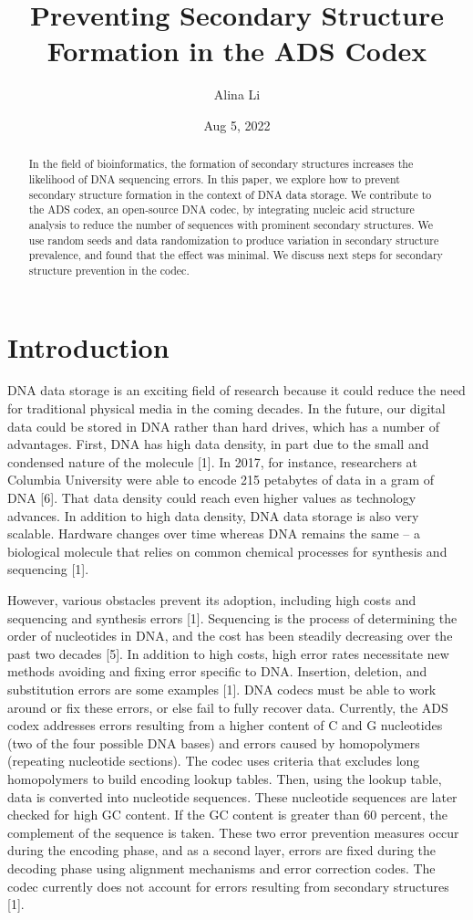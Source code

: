 \documentclass{article}
\title{Preventing Secondary Structure Formation in the ADS Codex}
\author{Alina Li}
\date{Aug 5, 2022}
\begin{document}
\maketitle

\begin{abstract}
In the field of bioinformatics, the formation of secondary structures increases the likelihood of DNA sequencing errors. In this paper, we explore how to prevent secondary structure formation in the context of DNA data storage. We contribute to the ADS codex, an open-source DNA codec, by integrating nucleic acid structure analysis to reduce the number of sequences with prominent secondary structures. We use random seeds and data randomization to produce variation in secondary structure prevalence, and found that the effect was minimal. We discuss next steps for secondary structure prevention in the codec.
\end{abstract}

\section{Introduction}
DNA data storage is an exciting field of research because it could reduce the need for traditional physical media in the coming decades. In the future, our digital data could be stored in DNA rather than hard drives, which has a number of advantages. First, DNA has high data density, in part due to the small and condensed nature of the molecule [1]. In 2017, for instance, researchers at Columbia University were able to encode 215 petabytes of data in a gram of DNA [6]. That data density could reach even higher values as technology advances. In addition to high data density, DNA data storage is also very scalable. Hardware changes over time whereas DNA remains the same -- a biological molecule that relies on common chemical processes for synthesis and sequencing [1].  

However, various obstacles prevent its adoption, including high costs and sequencing and synthesis errors [1]. Sequencing is the process of determining the order of nucleotides in DNA, and the cost has been steadily decreasing over the past two decades [5]. In addition to high costs, high error rates necessitate new methods avoiding and fixing error specific to DNA. Insertion, deletion, and substitution errors are some examples [1]. DNA codecs must be able to work around or fix these errors, or else fail to fully recover data. Currently, the ADS codex addresses errors resulting from a higher content of C and G nucleotides (two of the four possible DNA bases) and errors caused by homopolymers (repeating nucleotide sections). The codec uses  criteria that excludes long homopolymers to build encoding lookup tables. Then, using the lookup table, data is converted into nucleotide sequences. These nucleotide sequences are later checked for high GC content. If the GC content is greater than 60 percent, the complement of the sequence is taken. These two error prevention measures occur during the encoding phase, and as a second layer, errors are fixed during the decoding phase using alignment mechanisms and error correction codes. The codec currently does not account for errors resulting from secondary structures [1].
\end{document}
